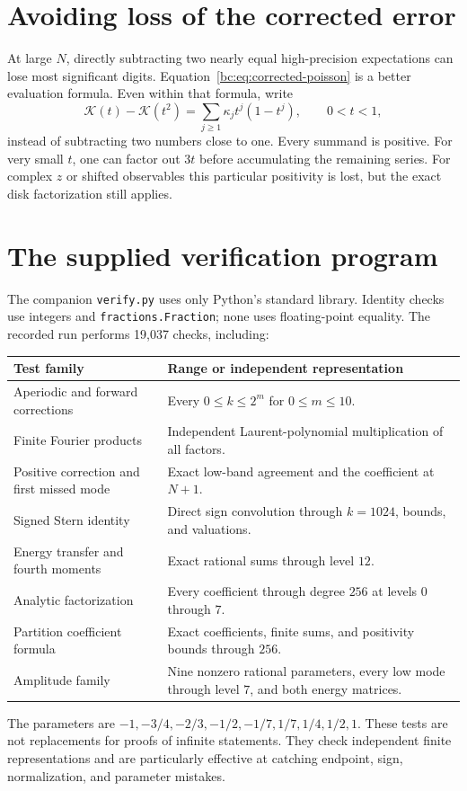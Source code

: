 \documentclass[11pt,a4paper,oneside,openany]{book}
\numberwithin{equation}{chapter}
\theoremstyle{definition}
\theoremstyle{remark}
\begin{document}
\section{Avoiding loss of the corrected error}
At large $N$, directly subtracting two nearly equal high-precision expectations
can lose most significant digits. Equation~\eqref{bc:eq:corrected-poisson} is a
better evaluation formula. Even within that formula, write
\begin{equation}
 \mathcal K(t)-\mathcal K(t^2)=\sum_{j\ge1}\kappa_jt^j(1-t^j),\qquad 0<t<1,
 \label{bc:eq:positive-evaluation}
\end{equation}
instead of subtracting two numbers close to one. Every summand is positive.
For very small $t$, one can factor out $3t$ before accumulating the remaining
series. For complex $z$ or shifted observables this particular positivity is
lost, but the exact disk factorization still applies.

\section{The supplied verification program}
The companion \texttt{verify.py} uses only Python's standard library. Identity
checks use integers and \texttt{fractions.Fraction}; none uses floating-point
equality. The recorded run performs 19,037 checks, including:
\begin{center}
\begin{tabularx}{\textwidth}{@{}p{}X@{}}
\toprule
Test family & Range or independent representation \\
\midrule
Aperiodic and forward corrections & Every $0\le k\le2^m$ for $0\le m\le10$. \\
Finite Fourier products & Independent Laurent-polynomial multiplication of all factors. \\
Positive correction and first missed mode & Exact low-band agreement and the coefficient at $N+1$. \\
Signed Stern identity & Direct sign convolution through $k=1024$, bounds, and valuations. \\
Energy transfer and fourth moments & Exact rational sums through level $12$. \\
Analytic factorization & Every coefficient through degree $256$ at levels $0$ through $7$. \\
Partition coefficient formula & Exact coefficients, finite sums, and positivity bounds through $256$. \\
Amplitude family & Nine nonzero rational parameters, every low mode through level $7$, and both energy matrices. \\
\bottomrule
\end{tabularx}
\end{center}
The parameters are $-1,-3/4,-2/3,-1/2,-1/7,1/7,1/4,1/2,1$.
These tests are not replacements for proofs of infinite statements. They check
independent finite representations and are particularly effective at catching
endpoint, sign, normalization, and parameter mistakes.
\end{document}
